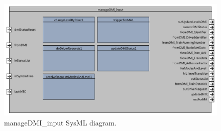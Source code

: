 \begin{figure}[H]
\center
\includegraphics[width=\textwidth]{images/F2_10_manageDMI_input.pdf}
\caption{manageDMI\_input SysML diagram.}\label{f:ManageDMIInput}
\end{figure}



